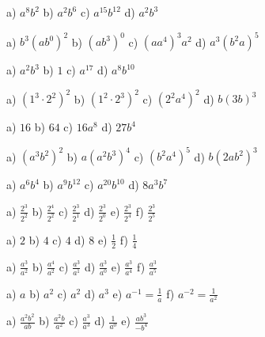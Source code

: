 {\begin{tehtava}
\begin{vastaus}
a) $a^8b^2$ \qquad b) $a^2b^6$ \qquad c) $a^{15}b^{12}$ \qquad d) $a^2b^3$
\end{vastaus}
\end{tehtava}
\begin{tehtava}
a) $b^3(ab^0)^2$ \qquad b) $(ab^3)^0$ \qquad c) $(aa^4)^3a^2$ \qquad d) $a^3(b^2a)^5$
\begin{vastaus}
a) $a^2b^3$ \qquad b) $1$ \qquad c) $a^{17}$ \qquad d) $a^8b^{10}$
\end{vastaus}
\end{tehtava}
\begin{tehtava}
a) $(1^3\cdot 2^2)^2$ \qquad b) $(1^2\cdot 2^3)^2$ \qquad c) $(2^2a^4)^2$ \qquad d) $b(3b)^3$
\begin{vastaus}
a) $16$ \qquad b) $64$ \qquad c) $16a^8$ \qquad d) $27b^4$
\end{vastaus}
\end{tehtava}
\begin{tehtava}
a) $(a^3b^2)^2$ \qquad b) $a(a^2b^3)^4$ \qquad c) $(b^2a^4)^5$ \qquad d) $b(2ab^2)^3$
\begin{vastaus}
a) $a^6b^4$ \qquad b) $a^9b^{12}$ \qquad c) $a^{20}b^{10}$ \qquad d) $8a^3b^7$
\end{vastaus}
\end{tehtava}
\begin{tehtava}
a) $\frac{2^3}{2^2}$ \qquad b) $\frac{2^4}{2^2}$ \qquad c) $\frac{2^3}{2^1}$ \qquad d) $\frac{2^3}{2^0}$ \qquad e) $\frac{2^3}{2^4}$
\qquad f) $\frac{2^3}{2^5}$
\begin{vastaus}
a) $2$ \qquad b) $4$ \qquad c) $4$ \qquad d) $8$ \qquad e) $\frac{1}{2}$ \qquad f) $\frac{1}{4}$
\end{vastaus}
\end{tehtava}
\begin{tehtava}
a) $\frac{a^3}{a^2}$ \qquad b) $\frac{a^4}{a^2}$ \qquad c) $\frac{a^3}{a^1}$ \qquad d) $\frac{a^3}{a^0}$ \qquad e) $\frac{a^3}{a^4}$
\qquad f) $\frac{a^3}{a^5}$
\begin{vastaus}
a) $a$ \qquad b) $a^2$ \qquad c) $a^2$ \qquad d) $a^3$ \qquad e) $a^{-1} = \frac{1}{a}$ \qquad f) $a^{-2} = \frac{1}{a^2}$
\end{vastaus}
\end{tehtava}
\begin{tehtava}
a) $\frac{a^2b^2}{ab}$ \qquad b) $\frac{a^2b}{a^2}$ \qquad c) $\frac{a^3}{a^3}$ \qquad d) $\frac{1}{a^0}$ \qquad e) $\frac{ab^3}{-b^4}$

\end{tehtava}}
